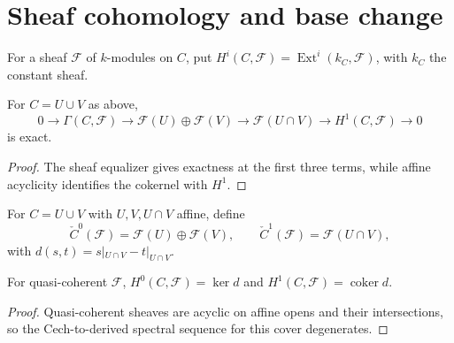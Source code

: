 \chapter{Sheaf cohomology and base change}
\label{pa-ch-cohomology}

\begin{definition}
  \label{pa-def-module-cohomology}
  \cite{stacks-project}
  For a sheaf \(\mathcal F\) of \(k\)-modules on \(C\), put
  \(H^i(C,\mathcal F)=\operatorname{Ext}^i(k_C,\mathcal F)\), with \(k_C\)
  the constant sheaf.
\end{definition}

\begin{proposition}
  \label{pa-prop-cech-short-exact}
  \cite{stacks-project}
  For \(C=U\cup V\) as above,
  \[
    0\to\Gamma(C,\mathcal F)\to\mathcal F(U)\oplus\mathcal F(V)
    \to\mathcal F(U\cap V)\to H^1(C,\mathcal F)\to0
  \]
  is exact.
\end{proposition}

\begin{proof}
  The sheaf equalizer gives exactness at the first three terms, while affine
  acyclicity identifies the cokernel with \(H^1\).
\end{proof}

\begin{definition}
  \label{pa-def-cech-complex}
  \cite{stacks-project}
  For \(C=U\cup V\) with \(U,V,U\cap V\) affine, define
  \[
    \check C^0(\mathcal F)=\mathcal F(U)\oplus\mathcal F(V),\qquad
    \check C^1(\mathcal F)=\mathcal F(U\cap V),
  \]
  with \(d(s,t)=s|_{U\cap V}-t|_{U\cap V}\).
\end{definition}

\begin{lemma}
  \label{pa-lem-cech-computes}
  \cite{stacks-project}
  For quasi-coherent \(\mathcal F\),
  \(H^0(C,\mathcal F)=\ker d\) and \(H^1(C,\mathcal F)=\operatorname{coker}d\).
\end{lemma}

\begin{proof}
  Quasi-coherent sheaves are acyclic on affine opens and their intersections,
  so the Cech-to-derived spectral sequence for this cover degenerates.
\end{proof}

